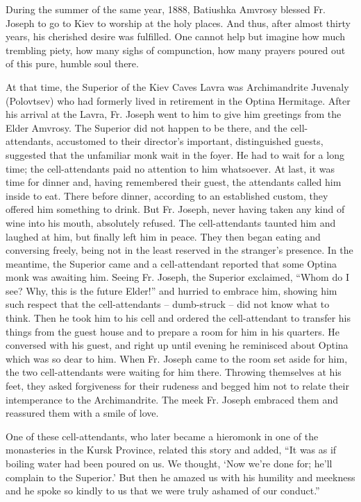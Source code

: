 During the summer of the same year, 1888, Batiushka Amvrosy blessed Fr. Joseph to go to Kiev to worship at the holy places. And thus, after almost thirty years, his cherished desire was fulfilled. One cannot help but imagine how much trembling piety, how many sighs of compunction, how many prayers poured out of this pure, humble soul there.

At that time, the Superior of the Kiev Caves Lavra was Archimandrite Juvenaly (Polovtsev) who had formerly lived in retirement in the Optina Hermitage. After his arrival at the Lavra, Fr. Joseph went to him to give him greetings from the Elder Amvrosy. The Superior did not happen to be there, and the cell-attendants, accustomed to their director's important, distinguished guests, suggested that the unfamiliar monk wait in the foyer. He had to wait for a long time; the cell-attendants paid no attention to him whatsoever. At last, it was time for dinner and, having remembered their guest, the attendants called him inside to eat. There before dinner, according to an established custom, they offered him something to drink. But Fr. Joseph, never having taken any kind of wine into his mouth, absolutely refused. The cell-attendants taunted him and laughed at him, but finally left him in peace. They then began eating and conversing freely, being not in the least reserved in the stranger's presence. In the meantime, the Superior came and a cell-attendant reported that some Optina monk was awaiting him. Seeing Fr. Joseph, the Superior exclaimed, ``Whom do I see? Why, this is the future Elder!'' and hurried to embrace him, showing him such respect that the cell-attendants -- dumb-struck -- did not know what to think. Then he took him to his cell and ordered the cell-attendant to transfer his things from the guest house and to prepare a room for him in his quarters. He conversed with his guest, and right up until evening he reminisced about Optina which was so dear to him. When Fr. Joseph came to the room set aside for him, the two cell-attendants were waiting for him there. Throwing themselves at his feet, they asked forgiveness for their rudeness and begged him not to relate their intemperance to the Archimandrite. The meek Fr. Joseph embraced them and reassured them with a smile of love.

One of these cell-attendants, who later became a hieromonk in one of the monasteries in the Kursk Province, related this story and added, ``It was as if boiling water had been poured on us. We thought, `Now we're done for; he'll complain to the Superior.' But then he amazed us with his humility and meekness and he spoke so kindly to us that we were truly ashamed of our conduct.''

